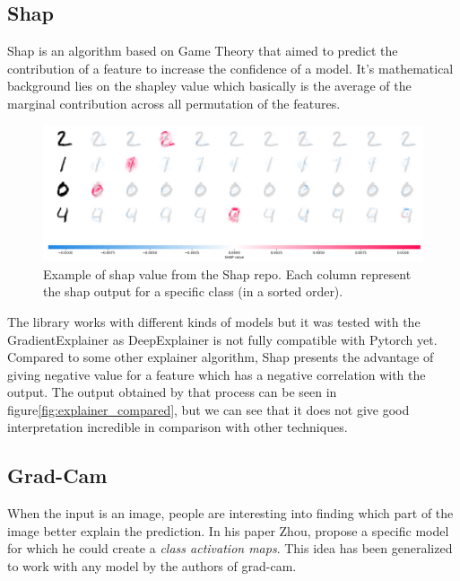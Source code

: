 \subsection{Shap}
Shap is an algorithm based on Game Theory that aimed to predict the contribution of a feature to increase the confidence of a model. It’s mathematical background lies on the shapley value which basically is the average of the marginal contribution across all permutation of the features.

\begin{figure}
 \centering
 \includegraphics[width=.9\linewidth]{figures/shap_mnist_image_plot.png}
 \captionsetup{width=.9\linewidth}
 \caption[ShapExample]{Example of shap value from the Shap repo\footnotemark{}. Each column represent the shap output for a specific class (in a sorted order).}
 \label{fig:shap_example}
\end{figure}

The library\cite{shap_lundberg2017unified} works with different kinds of models but it was tested with the GradientExplainer as DeepExplainer is not fully compatible with Pytorch yet. Compared to some other explainer algorithm, Shap presents the advantage of giving negative value for a feature which has a negative correlation with the output. The output obtained by that process can be seen in figure\ref{fig:explainer_compared}, but we can see that it does not give good interpretation incredible in comparison with other techniques.



\subsection{Grad-Cam}
When the input is an image, people are interesting into finding which part of the image better explain the prediction. In his paper\cite{zhou2015cnnlocalization} Zhou, propose a specific model for which he could create a \textit{class activation maps}. This idea has been generalized to work with any model by the authors of grad-cam. 

